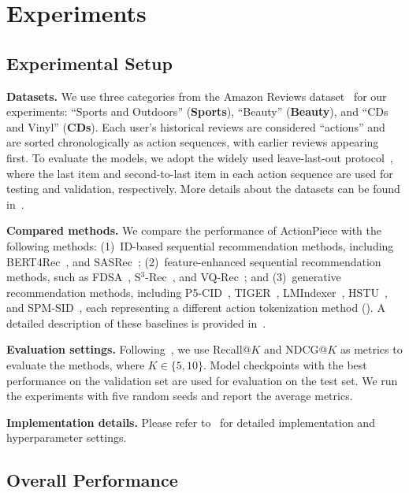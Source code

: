 \section{Experiments}

\subsection{Experimental Setup}

\textbf{Datasets.} We use three categories from the Amazon Reviews dataset~\cite{mcauley2015image} for our experiments: ``Sports and Outdoors'' (\textbf{Sports}), ``Beauty'' (\textbf{Beauty}), and ``CDs and Vinyl'' (\textbf{CDs}). Each user’s historical reviews are considered ``actions'' and are sorted chronologically as action sequences, with earlier reviews appearing first. To evaluate the models, we adopt the widely used leave-last-out protocol~\cite{kang2018sasrec,zhao2022revisiting,rajput2023tiger}, where the last item and second-to-last item in each action sequence are used for testing and validation, respectively. More details about the datasets can be found in~.

\textbf{Compared methods.} We compare the performance of ActionPiece with the following methods: (1)~ID-based sequential recommendation methods, including BERT4Rec~\cite{sun2019bert4rec}, and SASRec~\cite{kang2018sasrec}; (2)~feature-enhanced sequential recommendation methods, such as FDSA~\cite{zhang2019fdsa}, S$^3$-Rec~\cite{zhou2020s3}, and VQ-Rec~\cite{hou2023vqrec}; and (3)~generative recommendation methods, including P5-CID~\cite{hua2023p5cid}, TIGER~\cite{rajput2023tiger}, LMIndexer~\cite{jin2024lmindexer}, HSTU~\cite{zhai2024hstu}, and SPM-SID~\cite{singh2024spmsid}, each representing a different action tokenization method (). A detailed description of these baselines is provided in~.

\textbf{Evaluation settings.} Following~\citet{rajput2023tiger}, we use Recall@$K$ and NDCG@$K$ as metrics to evaluate the methods, where $K \in \{5, 10\}$. Model checkpoints with the best performance on the validation set are used for evaluation on the test set. We run the experiments with five random seeds and report the average metrics.

\textbf{Implementation details.} Please refer to~ for detailed implementation and hyperparameter settings.


\subsection{Overall Performance}

